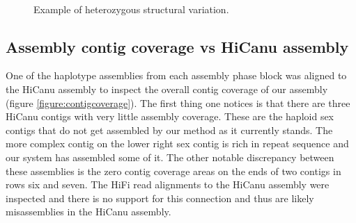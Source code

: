 \begin{figure}[htbp!]
\caption{Example of heterozygous structural variation.}
\label{figure:assemblyplot}
\begin{centering}
 \\
\end{centering}
\end{figure}

\subsection{Assembly contig coverage vs HiCanu assembly}

\par{
One of the haplotype assemblies from each assembly phase block was aligned to the HiCanu assembly to inspect the overall contig coverage of our assembly (figure \ref{figure:contigcoverage}). The first thing one notices is that there are three HiCanu contigs with very little assembly coverage. These are the haploid sex contigs that do not get assembled by our method as it currently stands. The more complex contig on the lower right sex contig is rich in repeat sequence and our system has assembled some of it. The other notable discrepancy between these assemblies is the zero contig coverage areas on the ends of two contigs in rows six and seven. The HiFi read alignments to the HiCanu assembly were inspected and there is no support for this connection and thus are likely misassemblies in the HiCanu assembly.
}

